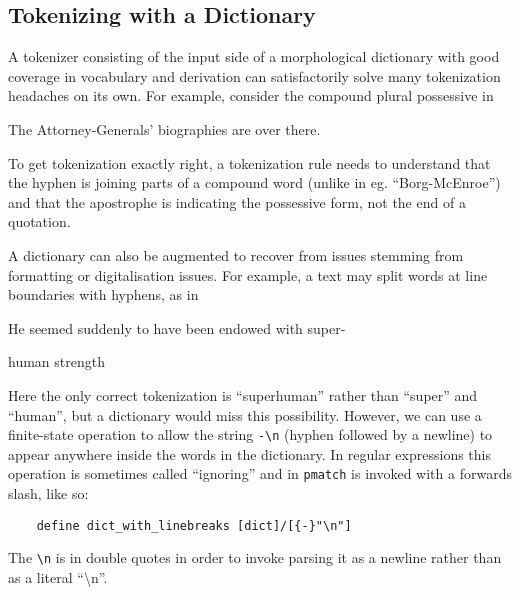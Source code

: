 \documentclass{llncs}
\begin{document}
\subsection{Tokenizing with a Dictionary}

A tokenizer consisting of the input side of a morphological dictionary
with good coverage in vocabulary and derivation can satisfactorily solve
many tokenization headaches on its own. For example, consider the compound
plural possessive in

\begin{exe}
  \item The Attorney-Generals' biographies are over there.
\end{exe}

To get tokenization exactly right, a tokenization rule needs to understand that
the hyphen is joining parts of a compound word (unlike in eg.
``Borg-McEnroe'') and that the apostrophe is indicating the possessive form,
not the end of a quotation.

A dictionary can also be augmented to recover from issues stemming from
formatting or digitalisation issues. For example, a text may split words
at line boundaries with hyphens, as in

\begin{exe}
\item He seemed suddenly to have been endowed with super-

  human strength
\end{exe}

Here the only correct tokenization is ``superhuman'' rather than ``super''
and ``human'', but a dictionary would miss this possibility. However,
we can use a finite-state operation to allow the string \verb+-\n+ (hyphen
followed by a newline) to appear anywhere inside the words in the dictionary.
In regular expressions this operation is sometimes called ``ignoring'' and in
\verb+pmatch+ is invoked with a forwards slash, like so:

\begin{center}
  \begin{framed}
\begin{verbatim}
    define dict_with_linebreaks [dict]/[{-}"\n"]
\end{verbatim}
  \end{framed}
\end{center}

The \verb+\n+ is in double quotes in order to invoke parsing it as a newline
rather than as a literal ``\textbackslash n''.
\end{document}
